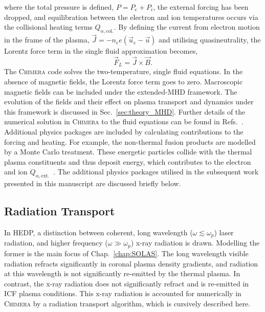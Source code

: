 where the total pressure is defined, $P=P_e+P_i$, the external forcing has been dropped, and equilibration between the electron and ion temperatures occurs via the collisional heating terms $Q_{\alpha,\text{col.}}$.
By defining the current from electron motion in the frame of the plasma, $\vec{J}=-n_e e (\vec{u}_e - \vec{u})$ and utilising quasineutrality, the Lorentz force term in the single fluid approximation becomes,
\begin{equation}
    \label{eq:theory_lorentz_force}
    \vec{F}_{L} = \vec{J}\times\vec{B}.
\end{equation}
The \textsc{Chimera} code solves the two-temperature, single fluid equations.
In the absence of magnetic fields, the Lorentz force term goes to zero.
Macroscopic magnetic fields can be included under the extended-\ac{MHD} framework.
The evolution of the fields and their effect on plasma transport and dynamics under this framework is discussed in Sec.~\ref{sec:theory_MHD}.
Further details of the numerical solution in \textsc{Chimera} to the fluid equations can be found in Refs.~\cite{chittenden_signatures_2016,walsh_extended_2018,crilly_simulation_2020,farrow_extended_2023,oneill_modelling_2023,chaturvedi_simulating_2024}. 
Additional physics packages are included by calculating contributions to the forcing and heating.
For example, the non-thermal fusion products are modelled by a Monte Carlo treatment.
These energetic particles collide with the thermal plasma constituents and thus deposit energy, which contributes to the electron and ion $Q_{\alpha,\text{ext.}}$~\cite{tong_burn_2019}.
The additional physics packages utilised in the subsequent work presented in this manuscript are discussed briefly below.

\subsection{Radiation Transport}%
\label{sec:theory_radtransp}

In \ac{HEDP}, a distinction between coherent, long wavelength ($\omega \lesssim \omega_p$) laser radiation, and higher frequency ($\omega \gg \omega_p$) x-ray radiation is drawn.
Modelling the former is the main focus of Chap.~\ref{chap:SOLAS}.
The long wavelength visible radiation refracts significantly in coronal plasma density gradients, and radiation at this wavelength is not significantly re-emitted by the thermal plasma.
In contrast, the x-ray radiation does not significantly refract and is re-emitted in \ac{ICF} plasma conditions.
This x-ray radiation is accounted for numerically in \textsc{Chimera} by a radiation transport algorithm, which is cursively described here.

